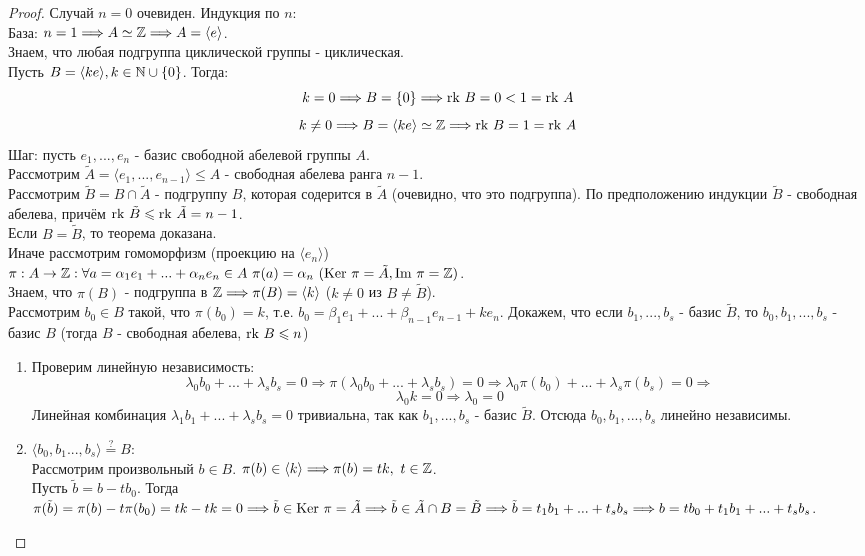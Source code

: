 \begin{proof}
    Случай $n = 0$ очевиден. Индукция по $n$:\\
    \tab База: $n = 1 \Longrightarrow A \simeq \mathbb{Z} \Longrightarrow A = \langle e \rangle$.\\
    Знаем, что любая подгруппа циклической группы - циклическая.\\
    Пусть $B = \langle ke \rangle, k \in \mathbb{N} \cup \{0\}$. Тогда:
    \[k = 0 \Longrightarrow B = \{0\} \Longrightarrow \textup{rk }B = 0 < 1 = \textup{rk }A\]
    \[k \neq 0 \Longrightarrow B = \langle ke \rangle \simeq \mathbb{Z} \Longrightarrow \textup{rk }B = 1 = \textup{rk }A\]
    \tab Шаг: пусть $e_1,...,e_n$ - базис свободной абелевой группы $A$.\\
    Рассмотрим $\tilde{A} = \langle e_1,...,e_{n-1} \rangle \leq A$ - свободная абелева ранга $n-1$.\\
    Рассмотрим $\tilde{B} = B \cap \tilde{A}$ - подгруппу $B$, которая содерится в $\tilde{A}$ (очевидно, что это подгруппа). По предположению индукции $\tilde{B}$ - свободная абелева, причём $\textup{rk }\tilde{B} \leqslant \textup{rk }\tilde{A} = n-1$.\\
    Если $B = \tilde{B}$, то теорема доказана. \\
    Иначе рассмотрим гомоморфизм (проекцию на $\langle e_n \rangle$) \\ $\pi: A \rightarrow \mathbb{Z}: \forall a = \alpha_1e_1 + ... + \alpha_ne_n \in A \ \pi(a) = \alpha_n \ (\textup{Ker }\pi = \tilde{A}, \textup{Im }\pi = \mathbb{Z})$.\\
    Знаем, что $\pi(B)$ - подгруппа в $\mathbb{Z} \Longrightarrow \pi(B) = \langle k \rangle$ ($k \neq 0$ из $B \neq \tilde{B}$).\\
    Рассмотрим $b_0 \in B$ такой, что $\pi(b_0) = k$, т.е. $b_0 = \beta_1e_1 + ... + \beta_{n-1}e_{n-1} + ke_n$. Докажем, что если $b_1,...,b_s$ - базис $\tilde{B}$, то $b_0, b_1,...,b_s$ - базис $B$ (тогда $B$ - свободная абелева, $\textup{rk }B \leqslant n$)
    \begin{enumerate}
        \item Проверим линейную независимость:
        \[\lambda_0b_0 + ... + \lambda_sb_s = 0 \Rightarrow \pi(\lambda_0b_0 + ... + \lambda_sb_s) = 0 \Rightarrow \lambda_0\pi(b_0) + ... + \lambda_s\pi(b_s) = 0 \Longrightarrow\]
        \[\lambda_0k = 0 \Rightarrow \lambda_0 = 0\]
        Линейная комбинация $\lambda_1b_1 + ... + \lambda_sb_s = 0$ тривиальна, так как $b_1,...,b_s$ - базис $\tilde{B}$. Отсюда $b_0,b_1,...,b_s$ линейно независимы.
        \item $\langle b_0,b_1...,b_s \rangle \overset{?}{=} B$:\\
        Рассмотрим произвольный $b \in B$. $\pi(b) \in \langle k \rangle \Longrightarrow \pi(b) = tk, \ t \in \mathbb{Z}$.\\
        Пусть $\tilde{b} = b - tb_0$. Тогда $\pi(\tilde{b}) = \pi(b) - t\pi(b_0) = tk - tk = 0 \Longrightarrow \tilde{b} \in \textup{Ker }\pi = \tilde{A} \Longrightarrow \tilde{b} \in \tilde{A} \cap B = \tilde{B} \Longrightarrow \tilde{b} = t_1b_1 + ... + t_sb_s \Longrightarrow b = tb_0 + t_1b_1 + ... + t_sb_s$.
    \end{enumerate}
\end{proof}
